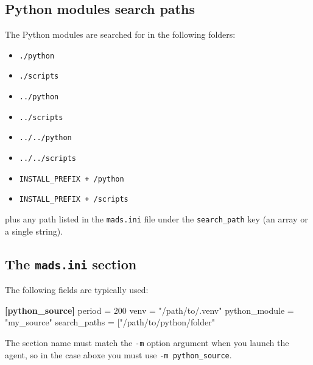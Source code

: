 \documentclass[
  letterpaper,
  DIV=11,
  numbers=noendperiod]{scrartcl}
\newenvironment{Shaded}{\begin{snugshade}}{\end{snugshade}}
\newcommand{\DataTypeTok}[1]{\textcolor[rgb]{0.68,0.00,0.00}{#1}}
\newcommand{\DecValTok}[1]{\textcolor[rgb]{0.68,0.00,0.00}{#1}}
\newcommand{\KeywordTok}[1]{\textcolor[rgb]{0.00,0.23,0.31}{\textbf{#1}}}
\newcommand{\OtherTok}[1]{\textcolor[rgb]{0.00,0.23,0.31}{#1}}
\newcommand{\StringTok}[1]{\textcolor[rgb]{0.13,0.47,0.30}{#1}}
\providecommand{\tightlist}{%
  \setlength{\itemsep}{0pt}\setlength{\parskip}{0pt}}\usepackage{longtable,booktabs,array}
\begin{document}
\subsection{Python modules search
paths}\label{python-modules-search-paths}

The Python modules are searched for in the following folders:

\begin{itemize}
\tightlist
\item
  \texttt{./python}
\item
  \texttt{./scripts}
\item
  \texttt{../python}
\item
  \texttt{../scripts}
\item
  \texttt{../../python}
\item
  \texttt{../../scripts}
\item
  \texttt{INSTALL\_PREFIX\ +\ /python}
\item
  \texttt{INSTALL\_PREFIX\ +\ /scripts}
\end{itemize}

plus any path listed in the \texttt{mads.ini} file under the
\texttt{search\_path} key (an array or a single string).

\subsection{\texorpdfstring{The \texttt{mads.ini}
section}{The mads.ini section}}\label{the-mads.ini-section}

The following fields are typically used:

\begin{Shaded}
\begin{Highlighting}[]
\KeywordTok{[python\_source]}
\DataTypeTok{period }\OtherTok{=}\StringTok{ }\DecValTok{200}
\DataTypeTok{venv }\OtherTok{=}\StringTok{ "/path/to/.venv"}
\DataTypeTok{python\_module }\OtherTok{=}\StringTok{ "my\_source"}
\DataTypeTok{search\_paths }\OtherTok{=}\StringTok{ ["/path/to/python/folder"}
\end{Highlighting}
\end{Shaded}

\begin{tcolorbox}[enhanced jigsaw, bottomtitle=1mm, opacitybacktitle=0.6, toprule=.15mm, breakable, colbacktitle=quarto-callout-warning-color!10!white, title=\textcolor{quarto-callout-warning-color}{\faExclamationTriangle}\hspace{0.5em}{Warning}, leftrule=.75mm, toptitle=1mm, colframe=quarto-callout-warning-color-frame, bottomrule=.15mm, coltitle=black, titlerule=0mm, rightrule=.15mm, arc=.35mm, left=2mm, colback=white, opacityback=0]

The section name must match the \texttt{-m} option argument when you
launch the agent, so in the case aboxe you must use
\texttt{-m\ python\_source}.

\end{tcolorbox}
\end{document}
